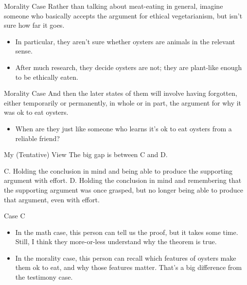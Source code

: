 \documentclass[
  17pt,
  letterpaper,
  ignorenonframetext,
  aspectratio=169,
]{beamer}
\providecommand{\tightlist}{%
  \setlength{\itemsep}{0pt}\setlength{\parskip}{0pt}}\usepackage{longtable,booktabs,array}
\begin{document}
\begin{frame}{Morality Case}
\protect\hypertarget{morality-case}{}
Rather than talking about meat-eating in general, imagine someone who
basically accepts the argument for ethical vegetarianism, but isn't sure
how far it goes.

\begin{itemize}[<+->]
\tightlist
\item
  In particular, they aren't sure whether oysters are animals in the
  relevant sense.
\item
  After much research, they decide oysters are not; they are plant-like
  enough to be ethically eaten.
\end{itemize}
\end{frame}

\begin{frame}{Morality Case}
\protect\hypertarget{morality-case-1}{}
And then the later states of them will involve having forgotten, either
temporarily or permanently, in whole or in part, the argument for why it
was ok to eat oysters.

\begin{itemize}[<+->]
\tightlist
\item
  When are they just like someone who learns it's ok to eat oysters from
  a reliable friend?
\end{itemize}
\end{frame}

\begin{frame}{My (Tentative) View}
\protect\hypertarget{my-tentative-view}{}
The big gap is between C and D.

C. Holding the conclusion in mind and being able to produce the
supporting argument with effort. D. Holding the conclusion in mind and
remembering that the supporting argument was once grasped, but no longer
being able to produce that argument, even with effort.
\end{frame}

\begin{frame}{Case C}
\protect\hypertarget{case-c}{}
\begin{itemize}[<+->]
\tightlist
\item
  In the math case, this person can tell us the proof, but it takes some
  time. Still, I think they more-or-less understand why the theorem is
  true.
\item
  In the morality case, this person can recall which features of oysters
  make them ok to eat, and why those features matter. That's a big
  difference from the testimony case.
\end{itemize}
\end{frame}
\end{document}
